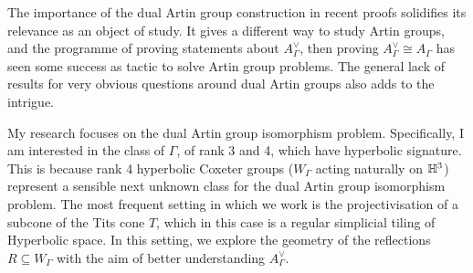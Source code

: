 The importance of the dual Artin group construction in recent proofs solidifies its relevance as an object of study.
It gives a different way to study Artin groups, and the programme of proving statements about $A^\vee_\Gamma$, then proving  $A^\vee_\Gamma \cong A_\Gamma$ has seen some success as tactic to solve Artin group problems.
The general lack of results for very obvious questions around dual Artin groups also adds to the intrigue.

My research focuses on the dual Artin group isomorphism problem.
Specifically, I am interested in the class of $\Gamma$, of rank 3 and 4, which have hyperbolic signature.
This is because rank 4  hyperbolic Coxeter groups ($W_\Gamma$ acting naturally on $\mathbb{H}^3$) represent a sensible next unknown class for the dual Artin group isomorphism problem.
The most frequent setting in which we work is the projectivisation of a subcone of the Tits cone $T$, which in this case is a regular simplicial tiling of Hyperbolic space.
In this setting, we explore the geometry of the reflections $R \subseteq W_\Gamma$ with the aim of better understanding  $A^\vee_\Gamma$.

